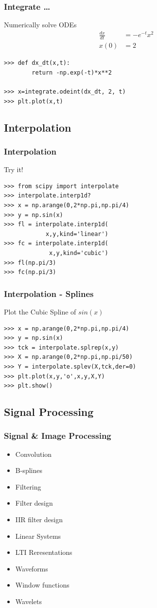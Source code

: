 \documentclass[14pt,compress]{beamer}
\newcounter{time}
\newcommand{\inctime}[1]{\addtocounter{time}{#1}{\tiny \thetime\ m}}
\begin{document}
\begin{frame}[fragile]
  \frametitle{Integrate \ldots}
  Numerically solve ODEs\\
  \begin{align*}
  \frac{dx}{dt}&=-e^{-t}x^2\\ 
           x(0)&=2    
  \end{align*}
  \begin{lstlisting}
>>> def dx_dt(x,t):
        return -np.exp(-t)*x**2

>>> x=integrate.odeint(dx_dt, 2, t)
>>> plt.plot(x,t)
  \end{lstlisting}
\inctime{10}
\end{frame}

\subsection{Interpolation}
\begin{frame}[fragile]
  \frametitle{Interpolation}
  Try it!
  \begin{lstlisting}
>>> from scipy import interpolate
>>> interpolate.interp1d?
>>> x = np.arange(0,2*np.pi,np.pi/4)
>>> y = np.sin(x)
>>> fl = interpolate.interp1d(
            x,y,kind='linear')
>>> fc = interpolate.interp1d(
             x,y,kind='cubic')
>>> fl(np.pi/3)
>>> fc(np.pi/3)
  \end{lstlisting}
\end{frame}

\begin{frame}[fragile]
  \frametitle{Interpolation - Splines}
  Plot the Cubic Spline of $sin(x)$
  \begin{lstlisting}
>>> x = np.arange(0,2*np.pi,np.pi/4)
>>> y = np.sin(x)
>>> tck = interpolate.splrep(x,y)
>>> X = np.arange(0,2*np.pi,np.pi/50)
>>> Y = interpolate.splev(X,tck,der=0)
>>> plt.plot(x,y,'o',x,y,X,Y)
>>> plt.show()
  \end{lstlisting}
\inctime{10}
\end{frame}

\subsection{Signal Processing}
\begin{frame}[fragile]
  \frametitle{Signal \& Image Processing}
    \begin{itemize}
     \item Convolution
     \item B-splines
     \item Filtering
     \item Filter design
     \item IIR filter design
     \item Linear Systems
     \item LTI Reresentations
     \item Waveforms
     \item Window functions
     \item Wavelets
    \end{itemize}
\end{frame}
\end{document}
